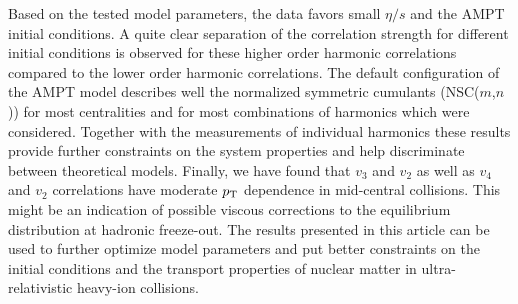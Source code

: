 Based on the tested model parameters, the data favors small $\eta/s$ and the AMPT initial conditions. A quite clear separation of the correlation strength for different initial conditions is observed for these higher order harmonic correlations compared to the lower order harmonic correlations.
The default configuration of the AMPT model describes well the normalized symmetric cumulants (NSC($m$,$n$)) for most centralities and for most combinations of harmonics which were considered. Together with the measurements of individual harmonics these results provide further constraints on the system properties and help discriminate between theoretical models.
Finally, we have found that $v_3$ and $v_2$ as well as $v_4$ and $v_2$ correlations have moderate $p_{\rm T}$ dependence in mid-central collisions. This might be an indication of possible viscous corrections to the equilibrium distribution at hadronic freeze-out.
The results presented in this article can be used to further optimize model parameters and put better constraints on the initial conditions and the transport properties of nuclear matter in ultra-relativistic heavy-ion collisions.


